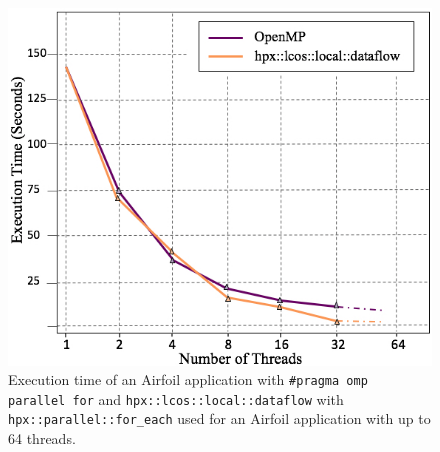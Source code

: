 \documentclass[conference]{IEEEtran}
\begin{document}
\begin{figure} [!h]
\begin{center}
\centering
\includegraphics[width=1\columnwidth]{Pictures/dataflow2.jpg}
\caption {\small{Execution time of an Airfoil application with \texttt{\#pragma omp parallel for} and  \texttt{hpx::lcos::local::dataflow} with \texttt{hpx::parallel::for\_each} used for an Airfoil application
with up to 64 threads.}}
\label{f2b}
\end{center}
\end{figure}
\end{document}
